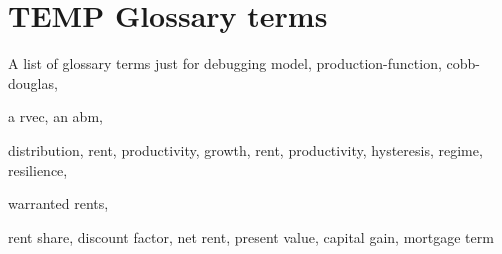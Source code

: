 \section{TEMP Glossary terms}

A list of glossary terms just for debugging
\gls{model}, 
\gls{production-function}, 
\gls{cobb-douglas}, 

a \gls{rvec}, 
an \gls{abm}, 

\gls{distribution},
\gls{rent}, 
\gls{productivity}, 
\gls{growth}, 
\gls{rent}, 
\gls{productivity}, 
\gls{hysteresis}, 
\gls{regime}, 
\gls{resilience}, 


\gls{warranted rents}, 

\gls{rent share},
\Gls{discount factor},
\gls{net rent}, 
\gls{present value}, 
\gls{capital gain},
\gls{mortgage term}